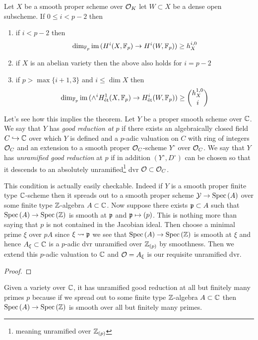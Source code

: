 \documentclass[12pt]{article}
\begin{document}
\begin{prop} \label{main_prop}
Let $X$ be a smooth proper scheme over $\mathcal{O}_K$ let $W \subset X$ be a dense open subscheme. If $0 \le i < p -2$ then
\begin{enumerate}
\item if $i < p - 2$ then
\[ \dim_{\mathbb{F}_p} \operatorname{\mathrm{im}}{(H^i(X, \mathbb{F}_p) \to H^i(W, \mathbb{F}_p))} \ge h^{i,0}_X \]
\item if $X$ is an abelian variety then the above also holds for $i = p - 2$
\item if $p > \max \{ i + 1 , 3 \}$ and $i \le \dim{X}$ then
\[ \dim_{\mathbb{F}_p} \operatorname{\mathrm{im}}{(\wedge^i H^1_{\text{\'{e}t}}(X, \mathbb{F}_p) \to H^i_{\text{\'{e}t}}(W, \mathbb{F}_p))} \ge { h^{1,0}_X \choose i } \]
\end{enumerate}
\end{prop}
\bigskip
Let's see how this implies the theorem. Let $Y$ be a proper smooth scheme over $\mathbb{C}$. We say that $Y$ has \textit{good reduction at} $p$ if there exists an algebraically closed field $C \hookrightarrow \mathbb{C}$ over which $Y$ is defined and a $p$-adic valuation on $C$ with ring of integers $\mathcal{O}_C$ and an extension to a smooth proper $\mathcal{O}_C$-scheme $Y^\circ$ over $\mathcal{O}_C$. We say that $Y$ has \textit{unramified good reduction} at $p$ if in addition $(Y^\circ, D^\circ)$ can be chosen so that it descends to an absolutely unramified\footnote{meaning unramified over $\mathbb{Z}_{(p)}$} dvr $\mathcal{O} \subset \mathcal{O}_C$. 

\begin{rmk}
This condition is actually easily checkable. Indeed if $Y$ is a smooth proper finite type $\mathbb{C}$-scheme then it spreads out to a smooth proper scheme $\mathcal{Y} \to \mathrm{Spec}\left( A \right)$ over some finite type $\mathbb{Z}$-algebra $A \subset \mathbb{C}$. Now suppose there exists $\mathfrak{p} \subset A$ such that $\mathrm{Spec}\left( A \right) \to \mathrm{Spec}\left( \mathbb{Z} \right)$ is smooth at $\mathfrak{p}$ and $\mathfrak{p} \mapsto (p)$. This is nothing more than saying that $p$ is not contained in the Jacobian ideal. Then choose a minimal prime $\xi$ over $p A$ since $\xi \rightsquigarrow \mathfrak{p}$ we see that $\mathrm{Spec}\left( A \right) \to \mathrm{Spec}\left( \mathbb{Z} \right)$ is smooth at $\xi$ and hence $A_{\xi} \subset \mathbb{C}$ is a $p$-adic dvr unramified over $\mathbb{Z}_{(p)}$ by smoothness. Then we extend this $p$-adic valuation to $\mathbb{C}$ and $\mathcal{O} = A_{\xi}$ is our requisite unramified dvr. 
\end{rmk}

\begin{proof}

\end{proof}

\begin{rmk}
Given a variety over $\mathbb{C}$, it has unramified good reduction at all but finitely many primes $p$ because if we spread out to some finite type $\mathbb{Z}$-algebra $A \subset \mathbb{C}$ then $\mathrm{Spec}\left( A \right) \to \mathrm{Spec}\left( \mathbb{Z} \right)$ is smooth over all but finitely many primes.
\end{rmk}
\end{document}
